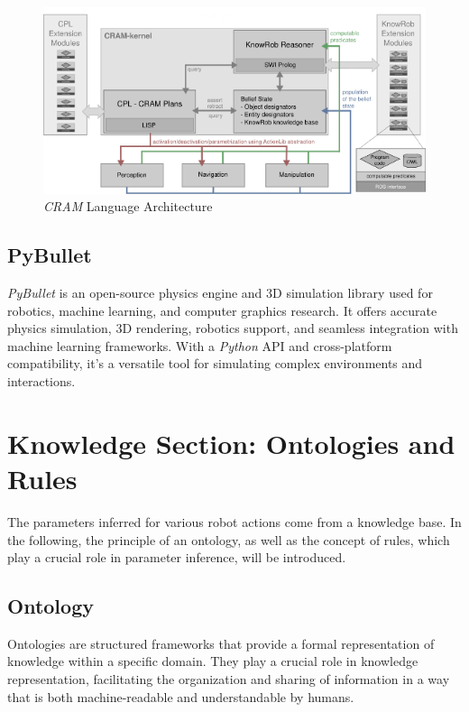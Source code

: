     \begin{figure}[H]
    \includegraphics[scale=1.5]{Graphics/cram-language-architecture.png}
	\caption{\textit{CRAM} Language Architecture}
    \end{figure}

	\subsection{PyBullet}
	\label{sec:pybullet}
	\textit{PyBullet}\cite{coumans2021} is an open-source physics engine and 3D simulation library used for robotics, machine learning, and computer graphics research. 
	It offers accurate physics simulation, 3D rendering, robotics support, and seamless integration with machine learning frameworks. 
	With a \textit{Python} API and cross-platform compatibility, it's a versatile tool for simulating complex environments and interactions.
    \section{Knowledge Section: Ontologies and Rules}
    The parameters inferred for various robot actions come from a knowledge base. In the following, the principle of an ontology, as well as the concept of rules, which play a crucial role in parameter inference, will be introduced.
    \subsection{Ontology}
	Ontologies are structured frameworks that provide a formal representation of knowledge within a specific domain. They play a crucial role in knowledge representation, facilitating the organization and sharing of information in a way that is both machine-readable and understandable by humans. 

